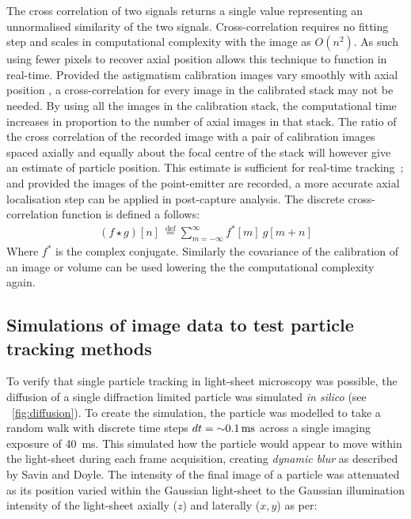 The cross correlation of two signals returns a single value representing an unnormalised similarity of the two signals.
Cross-correlation requires no fitting step and scales in computational complexity with the image as \(O(n^2)\).
As such using fewer pixels %
to recover axial position allows this technique to function in real-time.
Provided the astigmatism
calibration images vary smoothly with axial position
, a cross-correlation for every image in the calibrated stack may not be needed.
By using all the images in the calibration stack, the computational time increases in proportion to the number of axial images in that stack.
The ratio of the cross correlation of the recorded image with a pair of calibration images spaced axially and equally about the focal centre of the stack will however give an estimate of particle position.
This estimate is sufficient for real-time tracking~\cite{spilleDynamicThreedimensionalTracking2012}; and provided the images of the point-emitter are recorded, a more accurate axial localisation step can be applied in post-capture analysis.
The discrete cross-correlation function is defined a follows:
\begin{align}
(f \star g)[n]\ \stackrel{\mathrm{def}}{=} \sum_{m=-\infty}^{\infty} f^*[m]\ g[m+n]
\end{align}
Where \(f^*\) is the complex conjugate.
Similarly the covariance of the calibration of an image or volume can be used lowering the the computational complexity again.

\subsection{Simulations of image data to test particle tracking methods}
To verify that single particle tracking in light-sheet microscopy was possible, the diffusion of a single diffraction limited particle was simulated \emph{in silico} (see \figurename~\ref{fig:diffusion}).
To create the simulation, the particle was modelled to take a random walk with discrete time steps \(dt=\SI{\sim0.1}{\milli\second}\) across a single imaging exposure of \SI{40}{\milli\second}.
This simulated how the particle would appear to move within the light-sheet during each frame acquisition, creating \emph{dynamic blur} as described by Savin and Doyle\cite{savinStaticDynamicErrors2005}.
The intensity of the final image of a particle was attenuated as its position varied within the Gaussian light-sheet to the Gaussian illumination intensity of the light-sheet axially (\(z\)) and laterally (\(x,y\)) as per:

